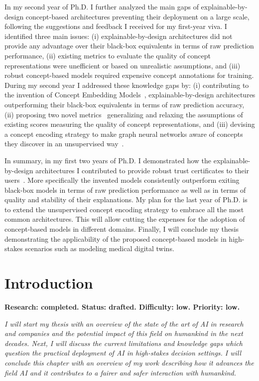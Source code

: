 \documentclass[withindex,glossary]{cam-thesis}
\theoremstyle{plain}
\theoremstyle{definition}
\theoremstyle{remark}
\begin{document}
In my second year of Ph.D. I further analyzed the main gaps of explainable-by-design concept-based architectures preventing their deployment on a large scale, following the suggestions and feedback I received for my first-year viva. I identified three main issues: (i) explainable-by-design architectures did not provide any advantage over their black-box equivalents in terms of raw prediction performance, (ii) existing metrics to evaluate the quality of concept representations were unefficient or based on unrealistic assumptions, and (iii) robust concept-based models required expensive concept annotations for training. During my second year I addressed these knowledge gaps by: (i) contributing to the invention of Concept Embedding Models~\citep{zarlenga2022concept}, explainable-by-design architectures outperforming their black-box equivalents in terms of raw prediction accuracy, (ii) proposing two novel metrics~\citep{zarlenga2021quality,zarlenga2022concept} generalizing and relaxing the assumptions of existing scores measuring the quality of concept representations, and (iii) devising a concept encoding strategy to make graph neural networks aware of concepts they discover in an unsupervised way~\citep{magister2022encoding}.

In summary, in my first two years of Ph.D. I demonstrated how the explainable-by-design architectures I contributed to provide robust trust certificates to their users~\citep{shen2022trust}. More specifically the invented models consistently outperform exiting black-box models in terms of raw prediction performance as well as in terms of quality and stability of their explanations. My plan for the last year of Ph.D. is to extend the unsupervised concept encoding strategy to embrace all the most common architectures. This will allow cutting the expenses for the adoption of concept-based models in different domains. Finally, I will conclude my thesis demonstrating the applicability of  the proposed concept-based models in high-stakes scenarios such as modeling medical digital twins.


\chapter{Introduction} \label{chapter:intro}
\textbf{Research: completed. Status: drafted. Difficulty: low. Priority: low.}

\textit{I will start my thesis with an overview of the state of the art of AI in research and companies and the potential impact of this field on humankind in the next decades. Next, I will discuss the current limitations and knowledge gaps which question the practical deployment of AI in high-stakes decision settings. I will conclude this chapter with an overview of my work describing how it advances the field AI and it contributes to a fairer and safer interaction with humankind.}
\end{document}
